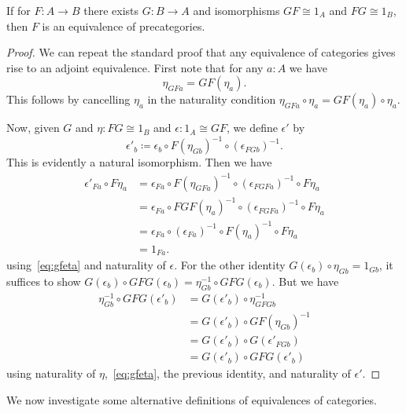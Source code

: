 \documentclass{amsart}
\newcommand{\defeq}{\coloneqq}  %
\theoremstyle{definition}
\theoremstyle{remark}
\numberwithin{equation}{section}
\begin{document}
\begin{lem}\label{ct:adjointification}
  If for $F:A\to B$ there exists $G:B\to A$ and isomorphisms $GF\cong 1_A$ and $FG\cong 1_B$, then $F$ is an equivalence of precategories.
\end{lem}
\begin{proof}
  We can repeat the standard proof that any equivalence of categories gives rise to an adjoint equivalence.
  First note that for any $a:A$ we have
  \begin{equation}
    \eta_{GFa} = GF(\eta_a).\label{eq:gfeta}
  \end{equation}
  This follows by cancelling $\eta_a$ in the naturality condition $\eta_{GFa} \circ \eta_a = GF(\eta_a) \circ \eta_a$.

  Now, given $G$ and $\eta:FG\cong 1_B$ and $\epsilon : 1_A \cong GF$, we define $\epsilon'$ by
  \[ \epsilon'_b \defeq
  \epsilon_b \circ
  F(\eta_{Gb})^{-1} \circ
  (\epsilon_{FGb})^{-1}.
  \]
  This is evidently a natural isomorphism.
  Then we have
  \begin{align*}
    \epsilon'_{Fa} \circ F\eta_{a}
    &= \epsilon_{Fa} \circ F(\eta_{GFa})^{-1} \circ (\epsilon_{FGFa})^{-1} \circ F\eta_a\\
    &= \epsilon_{Fa} \circ FGF(\eta_{a})^{-1} \circ (\epsilon_{FGFa})^{-1} \circ F\eta_a\\
    &= \epsilon_{Fa} \circ (\epsilon_{Fa})^{-1} \circ F(\eta_{a})^{-1} \circ F\eta_a\\
    &= 1_{Fa}.
  \end{align*}
  using~\eqref{eq:gfeta} and naturality of $\epsilon$.
  For the other identity $G(\epsilon_b) \circ \eta_{Gb} = 1_{Gb}$, it suffices to show $G(\epsilon_b) \circ GFG(\epsilon_b) = \eta_{Gb}^{-1} \circ GFG(\epsilon_b)$.
  But we have
  \begin{align*}
    \eta_{Gb}^{-1} \circ GFG(\epsilon'_b)
    &= G(\epsilon'_b) \circ \eta_{GFGb}^{-1}\\
    &= G(\epsilon'_b) \circ GF(\eta_{Gb})^{-1}\\
    &= G(\epsilon'_b) \circ G(\epsilon'_{FGb})\\
    &= G(\epsilon'_b) \circ GFG(\epsilon'_b)
  \end{align*}
  using naturality of $\eta$,~\eqref{eq:gfeta}, the previous identity, and naturality of $\epsilon'$.
\end{proof}

We now investigate some alternative definitions of equivalences of categories.
\end{document}
